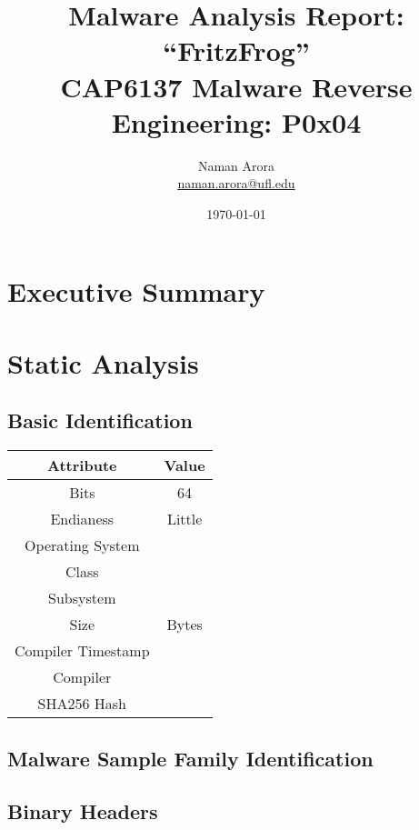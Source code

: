 \documentclass[10pt,a4paper]{article}
\begin{document}

\title{Malware Analysis Report: ``FritzFrog''\\ \vspace{-8pt} {\large CAP6137 Malware Reverse Engineering: P0x04}}
\author{{Naman Arora \\ \vspace{-10pt}\small \href{mailto:naman.arora@ufl.edu}{naman.arora@ufl.edu}}}
\date{\today}

\maketitle
\newpage
\tableofcontents
\newpage
\section{Executive Summary}

\newpage
\section{Static Analysis}
	\subsection{Basic Identification}
	\begin{center}
		\begin{tabular}{c | c}
			Attribute & Value\\
			\hline
			\hline
			Bits & 64\\
			Endianess & Little\\
			Operating System & \\
			\hline
			Class & \\
			Subsystem & \\
			\hline
			Size &  Bytes\\
			Compiler Timestamp & \\
			Compiler & \\
			SHA256 Hash & \\
			\hline
		\end{tabular}
	\end{center}

	\subsection{Malware Sample Family Identification}

	\subsection{Binary Headers}
\end{document}
